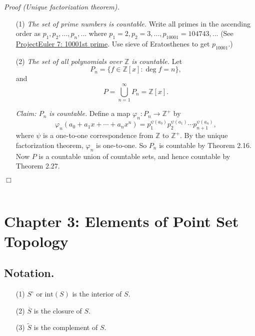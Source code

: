 \documentclass{article}
\begin{document}
\emph{Proof (Unique factorization theorem).}
\begin{enumerate}
\item[(1)]
\emph{The set of prime numbers is countable.}
Write all primes in the ascending order as $p_1, p_2, ..., p_n, ...$
where $p_1 = 2, p_2 = 3, ..., p_{10001} = 104743, ...$
(See \href{https://projecteuler.net/problem=7}{ProjectEuler 7: 10001st prime}.
Use sieve of Eratosthenes to get $p_{10001}$.)
\item[(2)]
\emph{The set of all polynomials over $\mathbb{Z}$ is countable.}
Let
$$P_n = \{ f \in \mathbb{Z}[x] : \deg f = n \},$$
and
$$P = \bigcup_{n = 1}^{\infty} P_n = \mathbb{Z}[x].$$

\emph{Claim: $P_n$ is countable.}
Define a map $\varphi_n: P_n \rightarrow \mathbb{Z}^+$ by
$$\varphi_n(a_0 + a_1 x + \cdots + a_n x^n)
= p_1^{\psi(a_0)} p_2^{\psi(a_1)} \cdots p_{n+1}^{\psi(a_n)},$$
where $\psi$ is a one-to-one correspondence from $\mathbb{Z}$ to $\mathbb{Z}^+$.
By the unique factorization theorem, $\varphi_n$ is one-to-one.
So $P_n$ is countable by Theorem 2.16.
Now $P$ is a countable union of countable sets,
and hence countable by Theorem 2.27.
\end{enumerate}
$\Box$ \\\\






\newpage
\section*{Chapter 3: Elements of Point Set Topology \\}



\subsection*{Notation.}
\begin{enumerate}
\item[(1)]
  $S^{\circ}$ or $\text{int}(S)$ is the interior of $S$.

\item[(2)]
  $\overline{S}$ is the closure of $S$.

\item[(3)]
  $\widetilde{S}$ is the complement of $S$. \\
\end{enumerate}
\end{document}
